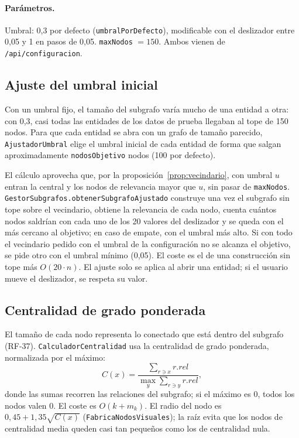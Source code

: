 \paragraph{Parámetros.} Umbral: 0,3 por defecto (\texttt{umbralPorDefecto}), modificable con el deslizador entre 0,05 y 1 en pasos de 0,05. \texttt{maxNodos} $=150$. Ambos vienen de \texttt{/api/configuracion}.

\subsection{Ajuste del umbral inicial}
\label{sec:alg-ajuste}

Con un umbral fijo, el tamaño del subgrafo varía mucho de una entidad a otra: con 0,3, casi todas las entidades de los datos de prueba llegaban al tope de 150 nodos. Para que cada entidad se abra con un grafo de tamaño parecido, \texttt{AjustadorUmbral} elige el umbral inicial de cada entidad de forma que salgan aproximadamente \texttt{nodosObjetivo} nodos (100 por defecto).

El cálculo aprovecha que, por la proposición~\ref{prop:vecindario}, con umbral $u$ entran la central y los nodos de relevancia mayor que $u$, sin pasar de \texttt{maxNodos}. \texttt{GestorSubgrafos.obtenerSubgrafoAjustado} construye una vez el subgrafo sin tope sobre el vecindario, obtiene la relevancia de cada nodo, cuenta cuántos nodos saldrían con cada uno de los 20 valores del deslizador y se queda con el más cercano al objetivo; en caso de empate, con el umbral más alto. Si con todo el vecindario pedido con el umbral de la configuración no se alcanza el objetivo, se pide otro con el umbral mínimo (0,05). El coste es el de una construcción sin tope más $O(20\cdot n)$. El ajuste solo se aplica al abrir una entidad; si el usuario mueve el deslizador, se respeta su valor.

\subsection{Centralidad de grado ponderada}
\label{sec:alg-centralidad}

El tamaño de cada nodo representa lo conectado que está dentro del subgrafo (RF-37). \texttt{CalculadorCentralidad} usa la centralidad de grado ponderada, normalizada por el máximo:
\begin{equation}
  C(x) = \frac{\sum_{r \ni x} r.rel}{\max_{y} \sum_{r \ni y} r.rel},
\end{equation}
donde las sumas recorren las relaciones del subgrafo; si el máximo es 0, todos los nodos valen 0. El coste es $O(k + m_k)$. El radio del nodo es $0{,}45 + 1{,}35\sqrt{C(x)}$ (\texttt{FabricaNodosVisuales}); la raíz evita que los nodos de centralidad media queden casi tan pequeños como los de centralidad nula.

